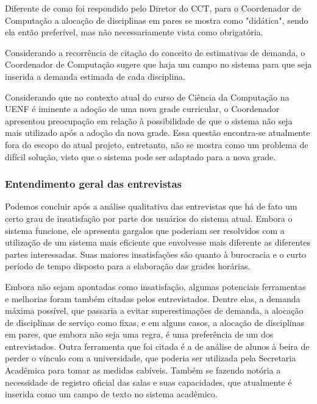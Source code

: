         Diferente de como foi respondido pelo Diretor do CCT, para o Coordenador de Computação a alocação de disciplinas em pares se mostra como "didática", sendo ela então preferível, mas não necessariamente vista como obrigatória.

        Considerando a recorrência de citação do conceito de estimativas de demanda, o Coordenador de Computação sugere que haja um campo no sistema para que seja inserida a demanda estimada de cada disciplina.

        Considerando que no contexto atual do curso de Ciência da Computação na UENF é iminente a adoção de uma nova grade curricular, o Coordenador apresentou preocupação em relação à possibilidade de que o sistema não seja mais utilizado após a adoção da nova grade. Essa questão encontra-se atualmente fora do escopo do atual projeto, entretanto, não se mostra como um problema de difícil solução, visto que o sistema pode ser adaptado para a nova grade.

    \subsubsection{Entendimento geral das entrevistas} %

        Podemos concluir após a análise qualitativa das entrevistas que há de fato um certo grau de insatisfação por parte dos usuários do sistema atual. Embora o sistema funcione, ele apresenta gargalos que poderiam ser resolvidos com a utilização de um sistema mais eficiente que envolvesse mais diferente as diferentes partes interessadas. Suas maiores insatisfações são quanto à burocracia e o curto período de tempo disposto para a elaboração das grades horárias.

        Embora não sejam apontadas como insatisfação, algumas potenciais ferramentas e melhorias foram também citadas pelos entrevistados. Dentre elas, a demanda máxima possível, que passaria a evitar superestimações de demanda, a alocação de disciplinas de serviço como fixas, e em alguns casos, a alocação de disciplinas em pares, que embora não seja uma regra, é uma preferência de um dos entrevistados. Outra ferramenta que foi citada é a de análise de alunos à beira de perder o vínculo com a universidade, que poderia ser utilizada pela Secretaria Acadêmica para tomar as medidas cabíveis. Também se fazendo notória a necessidade de registro oficial das salas e suas capacidades, que atualmente é inserida como um campo de texto no sistema acadêmico.

